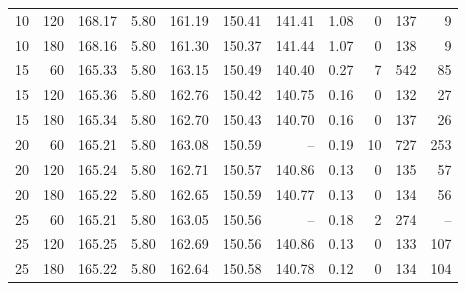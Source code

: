 \begin{table}[htb]
\begin{tabular}{rrrrrrrrrrr}
		10 & 120 & 168.17 & 5.80 & 161.19 & 150.41 & 141.41 & 1.08 & 0 & 137 & 9 \\
		10 & 180 & 168.16 & 5.80 & 161.30 & 150.37 & 141.44 & 1.07 & 0 & 138 & 9 \\
		15 & 60 & 165.33 & 5.80 & 163.15 & 150.49 & 140.40 & 0.27 & 7 & 542 & 85 \\
		15 & 120 & 165.36 & 5.80 & 162.76 & 150.42 & 140.75 & 0.16 & 0 & 132 & 27 \\
		15 & 180 & 165.34 & 5.80 & 162.70 & 150.43 & 140.70 & 0.16 & 0 & 137 & 26 \\
		20 & 60 & 165.21 & 5.80 & 163.08 & 150.59 & -- & 0.19 & 10 & 727 & 253 \\
		20 & 120 & 165.24 & 5.80 & 162.71 & 150.57 & 140.86 & 0.13 & 0 & 135 & 57 \\
		20 & 180 & 165.22 & 5.80 & 162.65 & 150.59 & 140.77 & 0.13 & 0 & 134 & 56 \\
		25 & 60 & 165.21 & 5.80 & 163.05 & 150.56 & -- & 0.18 & 2 & 274 & -- \\
		25 & 120 & 165.25 & 5.80 & 162.69 & 150.56 & 140.86 & 0.13 & 0 & 133 & 107 \\
		25 & 180 & 165.22 & 5.80 & 162.64 & 150.58 & 140.78 & 0.12 & 0 & 134 & 104 \\
		\bottomrule
	\end{tabular}
\end{table}

